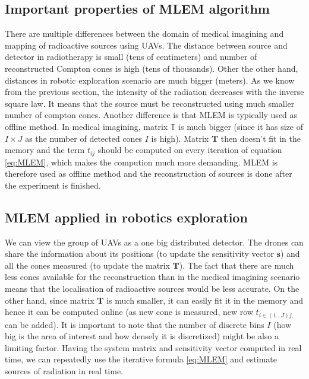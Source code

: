 \subsection{Important properties of MLEM algorithm}
There are multiple differences between the domain of medical imagining and mapping of radioactive sources using \ac{UAV}s.
The distance between source and detector in radiotherapy is small (tens of centimeters) and number of reconstructed Compton cones is high (tens of thousands).
Other the other hand, distances in robotic exploration scenario are much bigger (meters). 
As we know from the previous section, the intensity of the radiation decreases with the inverse square law.
It means that the source must be reconstructed using much smaller number of compton cones.
Another difference is that \ac{MLEM} is typically used as offline method.
In medical imagining, matrix $\mathbb{T}$ is much bigger (since it has size of $I \times J$ as the number of detected cones $I$ is high).
Matrix $\mathbf{T}$ then doesn't fit in the memory and the term $t_{ij}$ should be computed on every iteration of equation \ref{eq:MLEM}, which makes the compution much more demanding.
\ac{MLEM} is therefore used as offline method and the reconstruction of sources is done after the experiment is finished.

\subsection{MLEM applied in robotics exploration}
We can view the group of \ac{UAV}s as a one big distributed detector.
The drones can share the information about its positions (to update the sensitivity vector $\mathbf{s}$) and all the cones measured (to update the matrix $\mathbf{T}$).
The fact that there are much less cones available for the reconstruction than in the medical imagining scenario means that the localisation of radioactive sources would be less accurate. 
On the other hand, since matrix $\mathbf{T}$ is much smaller, it can easily fit it in the memory and hence it can be computed online (as new cone is measured, new row $t_{i\in(1 \dotsc J) j,}$ can be added). 
It is important to note that the number of discrete bins $I$ (how big is the area of interest and how densely it is discretized) might be also a limiting factor.
Having the system matrix and sensitivity vector computed in real time, we can repeatedly use the iterative formula \ref{eq:MLEM} and estimate sources of radiation in real time.








